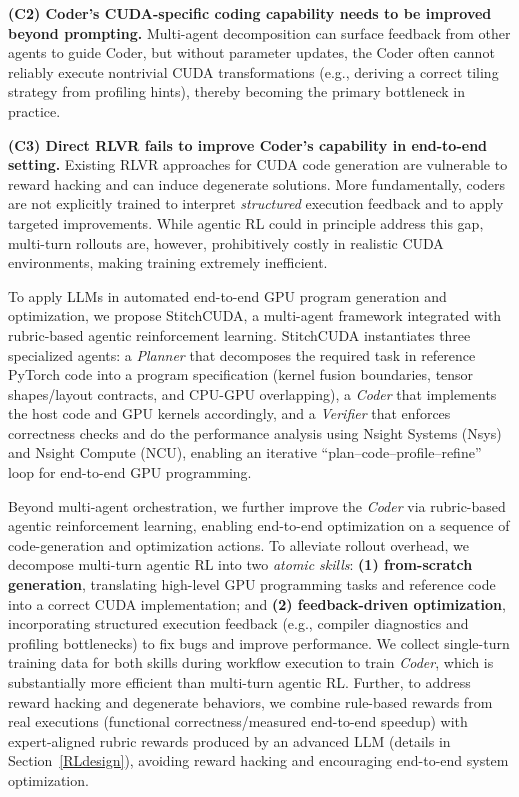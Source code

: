     \noindent \textbf{(C2) Coder's CUDA-specific coding capability needs to be improved beyond prompting.} %
    Multi-agent decomposition can surface feedback from other agents to guide Coder, but without parameter updates, the Coder often cannot reliably execute nontrivial CUDA transformations (e.g., deriving a correct tiling strategy from profiling hints), thereby becoming the primary bottleneck in practice.


    \noindent \textbf{(C3) Direct RLVR fails to improve Coder's capability in end-to-end setting.} 
    Existing RLVR approaches for CUDA code generation are vulnerable to reward hacking and can induce degenerate solutions. More fundamentally, coders are not explicitly trained to interpret \emph{structured} execution feedback and to apply targeted improvements. While agentic RL could in principle address this gap, multi-turn rollouts are, however, prohibitively costly in realistic CUDA environments, making training extremely inefficient.

  
To apply LLMs in automated end-to-end GPU program generation and optimization, we propose StitchCUDA, a multi-agent framework integrated with rubric-based agentic reinforcement learning. StitchCUDA instantiates three specialized agents: a \textit{Planner} that decomposes the required task in reference PyTorch code into a program specification (kernel fusion boundaries, tensor shapes/layout contracts, and CPU-GPU overlapping), a \textit{Coder} that implements the host code and GPU kernels accordingly, and a \textit{Verifier} that enforces correctness checks and do the performance analysis using Nsight Systems (Nsys) and Nsight Compute (NCU), enabling an iterative “plan–code–profile–refine” loop for end-to-end GPU programming. 

Beyond multi-agent orchestration, we further improve the \textit{Coder} via rubric-based agentic reinforcement learning, enabling end-to-end optimization on a sequence of code-generation and optimization actions. To alleviate rollout overhead, we decompose multi-turn agentic RL into two \emph{atomic skills}: \textbf{(1) from-scratch generation}, translating high-level GPU programming tasks and reference code into a correct CUDA implementation; and \textbf{(2) feedback-driven optimization}, incorporating structured execution feedback (e.g., compiler diagnostics and profiling bottlenecks) to fix bugs and improve performance. We collect single-turn training data for both skills during workflow execution to train \textit{Coder}, which is substantially more efficient than multi-turn agentic RL.
Further, to address reward hacking and degenerate behaviors,
we combine rule-based rewards from real executions (functional correctness/measured end-to-end speedup) with expert-aligned rubric rewards produced by an advanced LLM (details in Section~\ref{RLdesign}), avoiding reward hacking and encouraging end-to-end system optimization.



